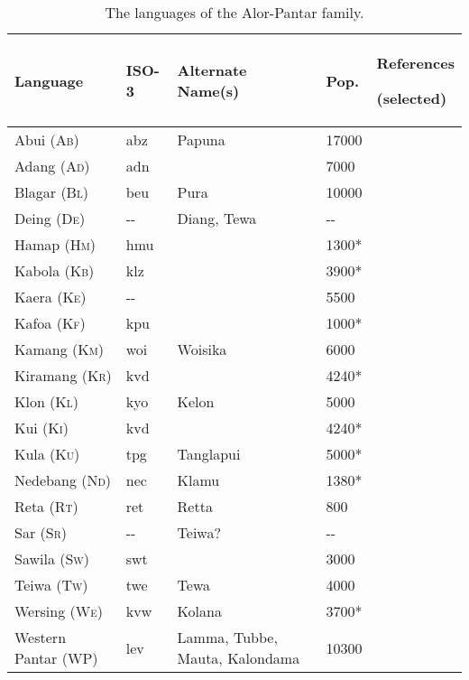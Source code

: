 \begin{table}\centering
\begin{tabular}{p{2.6cm}p{.9cm}p{1.7cm}lp{3.3cm}}
{Language}\footnotemark{} & {ISO\newline639-3} & {Alternate   Name(s)} & {Pop.}\footnotemark{} & {References \par (selected)}\\
\hline
Abui (A\textsc{b)} & abz & Papuna & 17000 & \citet{Kratochvil2007}\\
Adang (A\textsc{d)} & adn &  & 7000 & \citet{Haan2001,RobinsonEtAlta}\\
Blagar (B\textsc{l)} & beu & Pura & 10000 & \citet{Steinhauerta}\\
Deing (D\textsc{e)} & {}-{}- & Diang, Tewa & {}-{}- & \\
Hamap (H\textsc{m)} & hmu &  & 1300* & \\
Kabola (K\textsc{b)} & klz &  & 3900* & \citet{Stokhof1987}\\
Kaera (K\textsc{e)} & {}-{}- &  & 5500 & \citet{Klamertab}\\
Kafoa (K\textsc{f)} & kpu &  & 1000* & \citet{Bairdta}\\
Kamang (K\textsc{m)} & woi & Woisika & 6000 & \citet{Stokhof1977,Schapperta}\\
Kiramang (K\textsc{r)} & kvd &  & 4240* & \\
Klon (K\textsc{l)} & kyo & Kelon & 5000 & \citet{Baird2008}\\
Kui (K\textsc{i)} & kvd &  & 4240* & \\
Kula (K\textsc{u)} & tpg & Tanglapui & 5000* & \citet{WilliamsEtAlta,Donohue1996}\\
Nedebang (N\textsc{d)} & nec & Klamu & 1380* & \\
Reta (R\textsc{t)} & ret & Retta & 800 & \\
Sar (S\textsc{r)} & {}-{}- & Teiwa? & {}-{}- & \\
Sawila (S\textsc{w)} & swt &  & 3000 & \citet{Kratochvilta}\\
Teiwa (T\textsc{w)} & twe & Tewa & 4000 & \citet{Klamer2010a}\\
Wersing (W\textsc{e)} & kvw & Kolana & 3700* & \citet{SchapperEtAlta}\\
Western \newline Pantar (WP) & lev & Lamma, Tubbe, Mauta, Kalondama & 10300\footnotemark{} & \citet{Holton2010,Holtontaa}\\
\end{tabular}
\caption{The languages of the Alor-Pantar family.}
\end{table}

